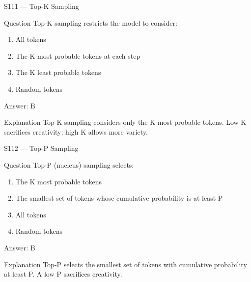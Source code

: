 \documentclass[aspectratio=169,8pt]{beamer}
\begin{document}
	\begin{frame}{S111 --- Top-K Sampling}
		\begin{block}{Question}
			Top-K sampling restricts the model to consider:
			\begin{enumerate}
				\item All tokens
				\item The K most probable tokens at each step
				\item The K least probable tokens
				\item Random tokens
			\end{enumerate}
		\end{block}
		\begin{exampleblock}{Answer: B}\end{exampleblock}
		\begin{block}{Explanation}
			Top-K sampling considers only the K most probable tokens. Low K sacrifices creativity; high K allows more variety.
		\end{block}
	\end{frame}
	
	\begin{frame}{S112 --- Top-P Sampling}
		\begin{block}{Question}
			Top-P (nucleus) sampling selects:
			\begin{enumerate}
				\item The K most probable tokens
				\item The smallest set of tokens whose cumulative probability is at least P
				\item All tokens
				\item Random tokens
			\end{enumerate}
		\end{block}
		\begin{exampleblock}{Answer: B}\end{exampleblock}
		\begin{block}{Explanation}
			Top-P selects the smallest set of tokens with cumulative probability at least P. A low P sacrifices creativity.
		\end{block}
	\end{frame}
	
\end{document}
